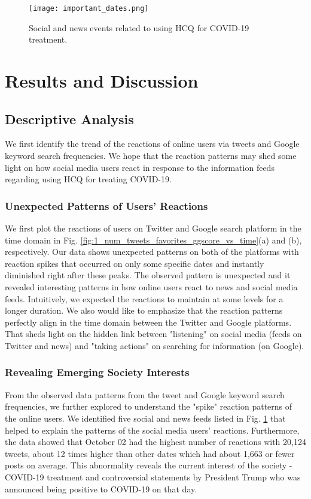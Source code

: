 \documentclass[conference]{IEEEtran}
\begin{document}
	\begin{figure}[tb]
		\centering 
		\texttt{[image: important\_dates.png]} 
		\caption{Social and news events related to using HCQ for COVID-19 treatment.}
		\label{fig:important_dates} 
		\vspace{-0.2in}
	\end{figure}
	\vspace{-0.1in}
	\section{Results and Discussion}
	\label{sec:results}
	
	\subsection{Descriptive Analysis}
	We first identify the trend of the reactions of online users via tweets and Google keyword search frequencies. We hope that the reaction patterns may shed some light on how social media users react in response to the information feeds regarding using HCQ for treating COVID-19.
	
	\subsubsection{Unexpected Patterns of Users' Reactions} 
	We first plot the reactions of users on Twitter and Google search platform in the time domain in Fig. \ref {fig:1_num_tweets_favorites_ggscore_vs_time}(a) and (b), respectively. Our data shows unexpected patterns on both of the platforms with reaction spikes that occurred on only some specific dates and instantly diminished right after these peaks. The observed pattern is unexpected and it revealed interesting patterns in how online users react to news and social media feeds. Intuitively, we expected the reactions to maintain at some levels for a longer duration. We also would like to emphasize that the reaction patterns perfectly align in the time domain between the Twitter and Google platforms. That sheds light on the hidden link between "listening" on social media (feeds on Twitter and news) and "taking actions" on searching for information (on Google).
	
	
	\subsubsection{Revealing Emerging Society Interests}
	From the observed data patterns from the tweet and Google keyword search frequencies, we further explored to understand the "spike" reaction patterns of the online users. We identified five social and news feeds listed in Fig. \ref{fig:important_dates} that helped to explain the patterns of the social media users' reactions. Furthermore, the data showed that October 02 had the highest number of reactions with 20,124 tweets, about 12 times higher than other dates which had about 1,663 or fewer posts on average. This abnormality reveals the current interest of the society - COVID-19 treatment and controversial statements by President Trump who was announced being positive to COVID-19 on that day.
	
\end{document}
